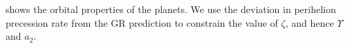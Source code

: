  shows the orbital properties of the planets. We use the deviation in perihelion precession rate from the GR prediction to constrain the value of $\zeta$, and hence $\Upsilon$ and $a_2$.
